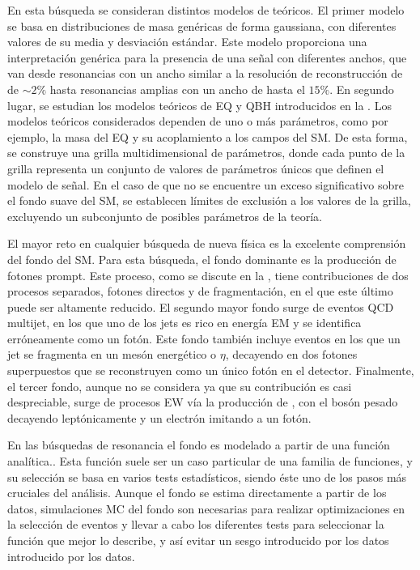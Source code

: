 En esta búsqueda se consideran distintos modelos de te\'oricos. El primer modelo se basa en distribuciones de masa genéricas de forma gaussiana, con diferentes valores de su media y desviación estándar. Este modelo proporciona una interpretación genérica para la presencia de una señal con diferentes anchos, que van desde resonancias con un ancho similar a la resolución de reconstrucci\'on de \myj de \(\sim 2\%\) hasta resonancias amplias con un ancho de hasta el \(15\%\).
En segundo lugar, se estudian los modelos teóricos de \acf{EQ} y \acf{QBH} introducidos en la \Sect{\ref{sec:theory:bsm}}. Los modelos te\'oricos considerados dependen de uno o más parámetros, como por ejemplo, la masa del \ac{EQ} y su acoplamiento a los campos del \ac{SM}. De esta forma, se construye una grilla multidimensional de parámetros, donde cada punto de la grilla representa un conjunto de valores de parámetros únicos que definen el modelo de señal. En el caso de que no se encuentre un exceso significativo sobre el fondo suave del \ac{SM}, se establecen límites de exclusión a los valores de la grilla, excluyendo un subconjunto de posibles parámetros de la teoría.


El mayor reto en cualquier búsqueda de nueva física es la excelente comprensión del fondo del \ac{SM}. Para esta búsqueda, el fondo dominante es la producción de fotones prompt. Este proceso, como se discute en la \Sect{\ref{subsec:theory:sm:prompt_photon}}, tiene contribuciones de dos procesos separados, fotones directos y de fragmentación, en el que este último puede ser altamente reducido. El segundo mayor fondo surge de eventos \ac{QCD} multijet, en los que uno de los jets es rico en energía \ac{EM} y se identifica erróneamente como un fotón. Este fondo también incluye eventos en los que un jet se fragmenta en un mesón energético \pizero o \(\eta\), decayendo en dos fotones superpuestos que se reconstruyen como un único fotón en el detector. Finalmente, el tercer fondo, aunque no se considera ya que su contribución es casi despreciable, surge de procesos \ac{EW} vía la producción de \WZjet, con el bosón pesado decayendo leptónicamente y un electrón imitando a un fotón.


En las búsquedas de resonancia el fondo es modelado a partir de una funci\'on anal\'itica.. Esta función suele ser un caso particular de una familia de funciones, y su selección se basa en varios tests estadísticos, siendo éste uno de los pasos más cruciales del análisis.
Aunque el fondo se estima directamente a partir de los datos, simulaciones \ac{MC} del fondo son necesarias para realizar optimizaciones en la selección de eventos y llevar a cabo los diferentes tests para seleccionar la función que mejor lo describe, y as\'i evitar un sesgo introducido por los datos introducido por los datos.


